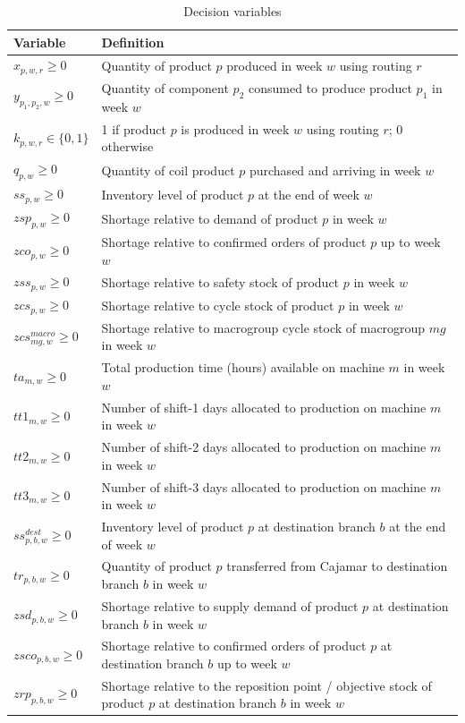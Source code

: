\documentclass{article}
\begin{document}
\begin{table}[h]
\centering
\begin{tabular}{l p{9cm}}
\hline
\textbf{Variable} & \textbf{Definition} \\
\hline
$x_{p,w,r} \geq 0$ & Quantity of product $p$ produced in week $w$ using routing $r$ \\
$y_{p_1,p_2,w} \geq 0$ & Quantity of component $p_2$ consumed to produce product $p_1$ in week $w$ \\
$k_{p,w,r} \in \{0,1\}$ & 1 if product $p$ is produced in week $w$ using routing $r$; 0 otherwise \\
$q_{p,w} \geq 0$ & Quantity of coil product $p$ purchased and arriving in week $w$ \\
$ss_{p,w} \geq 0$ & Inventory level of product $p$ at the end of week $w$ \\
$zsp_{p,w} \geq 0$ & Shortage relative to demand of product $p$ in week $w$ \\
$zco_{p,w} \geq 0$ & Shortage relative to confirmed orders of product $p$ up to week $w$ \\
$zss_{p,w} \geq 0$ & Shortage relative to safety stock of product $p$ in week $w$ \\
$zcs_{p,w} \geq 0$ & Shortage relative to cycle stock of product $p$ in week $w$ \\
$zcs^{macro}_{mg,w} \geq 0$ & Shortage relative to macrogroup cycle stock of macrogroup $mg$ in week $w$ \\
$ta_{m,w} \geq 0$ & Total production time (hours) available on machine $m$ in week $w$ \\
$tt1_{m,w} \geq 0$ & Number of shift-1 days allocated to production on machine $m$ in week $w$ \\
$tt2_{m,w} \geq 0$ & Number of shift-2 days allocated to production on machine $m$ in week $w$ \\
$tt3_{m,w} \geq 0$ & Number of shift-3 days allocated to production on machine $m$ in week $w$ \\
\hline
$ss^{dest}_{p,b,w} \geq 0$ & Inventory level of product $p$ at destination branch $b$ at the end of week $w$ \\
$tr_{p,b,w} \geq 0$ & Quantity of product $p$ transferred from Cajamar to destination branch $b$ in week $w$ \\
$zsd_{p,b,w} \geq 0$ & Shortage relative to supply demand of product $p$ at destination branch $b$ in week $w$ \\
$zsco_{p,b,w} \geq 0$ & Shortage relative to confirmed orders of product $p$ at destination branch $b$ up to week $w$ \\
$zrp_{p,b,w} \geq 0$ & Shortage relative to the reposition point / objective stock of product $p$ at destination branch $b$ in week $w$ \\
\hline
\end{tabular}
\caption{Decision variables}
\label{tab:decisionvars}
\end{table}
\end{document}

